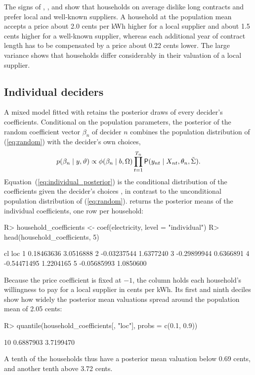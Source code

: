 \documentclass[article,shortnames]{jss}
\begin{document}
%
The signs of , , and  show that
households on average dislike long contracts and prefer local and well-known
suppliers. A household at the population mean accepts a price about
2.0 cents per kWh higher for
a local supplier and about
1.5 cents higher for a
well-known supplier, whereas each additional year of contract length has to be
compensated by a price about
0.22 cents lower. The
large variance  shows that households differ considerably
in their valuation of a local supplier.

\subsection{Individual deciders} \label{sec:individual}

A mixed model fitted with  retains the
posterior draws of every decider's coefficients. Conditional on the population
parameters, the posterior of the random coefficient vector $\beta_n$ of decider
$n$ combines the population distribution of (\ref{eq:random}) with the
decider's own choices,
%
\begin{equation}
\label{eq:individual_posterior}
p(\beta_n \mid y, \vartheta) \propto \phi(\beta_n \mid b, \Omega) \prod_{t =
1}^{T_n} \mathsf{P}(y_{nt} \mid X_{nt}, \theta_n, \tilde{\Sigma}).
\end{equation}
%
Equation~(\ref{eq:individual_posterior}) is the conditional distribution of the
coefficients given the decider's choices \citep[Chapter~11]{Train2009}, in
contrast to the unconditional population distribution of (\ref{eq:random}).
 returns the posterior means of the individual
coefficients, one row per household:
%
\begin{Schunk}
\begin{Sinput}
R> household_coefficients <- coef(electricity, level = "individual")
R> head(household_coefficients, 5)
\end{Sinput}
\begin{Soutput}
           cl       loc
1  0.18463636 3.0516888
2 -0.03237544 1.6377240
3 -0.29899944 0.6366891
4 -0.54471495 1.2204165
5 -0.05685993 1.0850600
\end{Soutput}
\end{Schunk}
%
Because the price coefficient is fixed at $-1$, the  column holds each
household's willingness to pay for a local supplier in cents per kWh. Its first
and ninth deciles show how widely the posterior mean valuations spread around
the population mean  of
2.05 cents:
%
\begin{Schunk}
\begin{Sinput}
R> quantile(household_coefficients[, "loc"], probs = c(0.1, 0.9))
\end{Sinput}
\begin{Soutput}
      10%
0.6887903 3.7199470 
\end{Soutput}
\end{Schunk}
%
A tenth of the households thus have a posterior mean valuation below
0.69 cents,
and another tenth above
3.72 cents.
\end{document}
